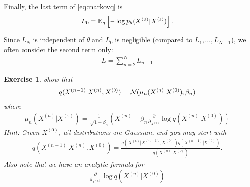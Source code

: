 \documentclass[11pt]{article}
\newtheorem{exercise}{Exercise}
\begin{document}
Finally, the last term of \eqref{eq:markovq} is
\begin{align}
    L_0 = \mathbb{E}_q\left[-\log p_{\theta}(X^{(0)}|X^{(1)})\right].
\end{align}

Since $L_N$ is independent of $\theta$ and $L_0$ is negligible (compared to $L_1, \dots, L_{N-1}$), we often consider the second term only:
\begin{align}
    L = \sum_{n=2}^N L_{n-1}
\end{align}

\begin{exercise}
    Show that 
    \begin{align}
        q(X^{(n-1)}|X^{(n)}, X^{(0)}) = {\cal N}(\mu_n(X^{(n)}|X^{(0)}), \beta_n)
    \end{align}
    where
    \begin{align}
        \mu_n(X^{(n)}|X^{(0)}) = \frac{1}{\sqrt{1-\beta_n}} \left(X^{(n)} + \beta_n \frac{\partial}{\partial_{X^{(n)}}} \log q (X^{(n)}|X^{(0)})\right)
    \end{align}
    Hint: Given $X^{(0)}$, all distributions are Gaussian, and you may start with
    \begin{align}
        q(X^{(n-1)}|X^{(n)}, X^{(0)}) = \frac{q(X^{(n)}|X^{(n-1)}, X^{(0)}) q(X^{(n-1)}|X^{(0)})}{q(X^{(n)}|X^{(0)})}.
    \end{align}
    Also note that we have an analytic formula for
    \begin{align}
        \frac{\partial}{\partial_{X^{(n)}}} \log q (X^{(n)}|X^{(0)})
    \end{align}
\end{exercise}
\end{document}
